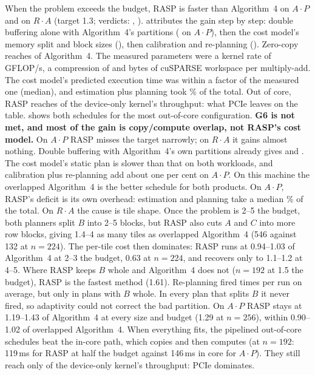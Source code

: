 When the problem exceeds the budget, RASP is \x{} faster than Algorithm~4 on $A\cdot P$ and
\x{} on $R\cdot A$ (target 1.3; verdicts: , ).
 attributes the gain step by step: double buffering alone with Algorithm~4's partitions
(\x{} on $A\cdot P$), then the cost model's memory split and block sizes
(\x), then calibration and re-planning (\x). Zero-copy reaches
\x{} of Algorithm~4. The measured parameters were a kernel rate of
\,GFLOP/s, a compression of  and  bytes of
cuSPARSE workspace per multiply-add. The cost model's predicted execution time was within a factor
 of the measured one (median), and estimation plus planning took \% of
the total. Out of core, RASP reaches  of the device-only kernel's throughput: what PCIe leaves
on the table.  shows both schedules for the most out-of-core configuration.
\textbf{G6 is not met, and most of the gain is copy/compute overlap, not RASP's cost model.} On $A\cdot P$ RASP
misses the target narrowly; on $R\cdot A$ it gains almost nothing. Double buffering with Algorithm~4's own partitions already gives \x{} and
\x. The cost model's static plan is slower than that on both workloads, and
calibration plus re-planning add about one per cent on $A\cdot P$. On this machine the overlapped Algorithm~4 is the
better schedule for both products. On $A\cdot P$, RASP's deficit is its own overhead: estimation and planning take a
median \% of the total. On $R\cdot A$ the cause is tile shape. Once the problem is 2--5\x{} the
budget, both planners split $B$ into 2--5 blocks, but RASP also cuts $A$ and $C$ into more row blocks, giving
1.4--4\x{} as many tiles as overlapped Algorithm~4 (546 against 132 at $n=224$). The per-tile cost then dominates:
RASP runs at 0.94--1.03\x{} of Algorithm~4 at 2--3\x{} the budget, 0.63\x{} at $n=224$, and recovers only to
1.1--1.2\x{} at 4--5\x. Where RASP keeps $B$ whole and Algorithm~4 does not ($n=192$ at 1.5\x{} the budget), RASP is
the fastest method (1.61\x). Re-planning fired  times per
run on average, but only in plans with $B$ whole. In every plan that splits $B$ it never fired, so adaptivity could not
correct the bad partition. On $A\cdot P$ RASP stays at 1.19--1.43\x{} of Algorithm~4 at every size and budget (1.29\x{} at
$n=256$), within 0.90--1.02\x{} of overlapped Algorithm~4. When everything fits, the pipelined out-of-core schedules beat the in-core path, which copies and
then computes (at $n=192$: 119\,ms for RASP at half the budget against 146\,ms in core for $A\cdot P$). They still reach
only  of the device-only kernel's throughput: PCIe dominates.

